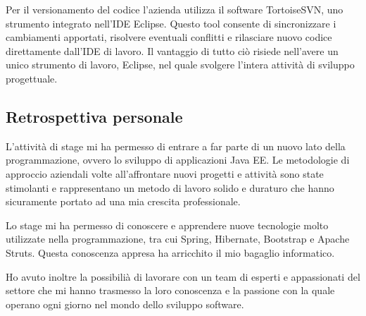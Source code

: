 \setlength{\parskip}{3ex}

\noindent Per il versionamento del codice l'azienda utilizza il software TortoiseSVN, uno strumento integrato nell'IDE Eclipse. Questo tool consente di sincronizzare i cambiamenti apportati, risolvere eventuali conflitti e rilasciare nuovo codice direttamente dall'IDE di lavoro. Il vantaggio di tutto ciò risiede nell'avere un unico strumento di lavoro, Eclipse, nel quale svolgere l'intera attività di sviluppo progettuale.

\subsection{Retrospettiva personale}
L'attività di stage mi ha permesso di entrare a far parte di un nuovo lato della programmazione, ovvero lo sviluppo di applicazioni Java EE. Le metodologie di approccio aziendali volte all'affrontare nuovi progetti e attività sono state stimolanti e rappresentano un metodo di lavoro solido e duraturo che hanno sicuramente portato ad una mia crescita professionale. 

\setlength{\parskip}{3ex}

\noindent Lo stage mi ha permesso di conoscere e apprendere nuove tecnologie molto utilizzate nella programmazione, tra cui Spring, Hibernate, Bootstrap e Apache Struts. Questa conoscenza appresa ha arricchito il mio bagaglio informatico.

\setlength{\parskip}{3ex}

\noindent Ho avuto inoltre la possibilià di lavorare con un team di esperti e appassionati del settore che mi hanno trasmesso la loro conoscenza e la passione con la quale operano ogni giorno nel mondo dello sviluppo software.